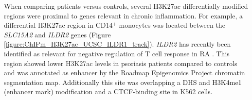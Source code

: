 When comparing patients versus controls, several H3K27ac differentially modified regions were proximal to genes relevant in chronic inflammation. For example, a differential H3K27ac region in CD14$^+$ monocytes was located between the \textit{SLC15A2} and \textit{ILDR2} genes (Figure \ref{figure:ChIPm_H3K27ac_UCSC_ILDR1_track}). \textit{ILDR2} has recently been identified as relevant for negative regulation of T cell response in RA \parencite{Hecht2018}. This region showed lower H3K27ac levels in psoriasis patients compared to controls and was annotated as enhancer by the Roadmap Epigenomics Project chromatin segmentation map. Additionally this site was overlapping a DHS and H3K4me1 (enhancer mark) modification and a CTCF-binding site in K562 cells. %





